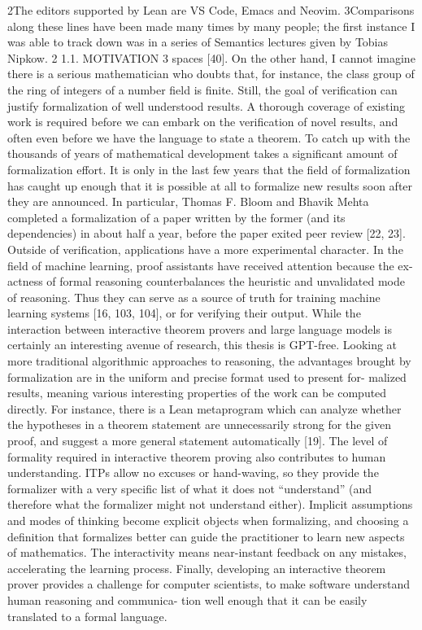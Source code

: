 \documentclass{book}
\theoremstyle{definition}
\begin{document}
2The editors supported by Lean are VS Code, Emacs and Neovim.
3Comparisons along these lines have been made many times by many people; the first instance I was
 able to track down was in a series of Semantics lectures given by Tobias Nipkow. 2
1.1. MOTIVATION   3
spaces [40]. On the other hand, I cannot imagine there is a serious mathematician who doubts that, for instance, the class group of the ring of integers of a number field is finite.
Still, the goal of verification can justify formalization of well understood results. A thorough coverage of existing work is required before we can embark on the verification of novel results, and often even before we have the language to state a theorem. To catch up with the thousands of years of mathematical development takes a significant amount of formalization effort. It is only in the last few years that the field of formalization has caught up enough that it is possible at all to formalize new results soon after they are announced. In particular, Thomas F. Bloom and Bhavik Mehta completed a formalization of a paper written by the former (and its dependencies) in about half a year, before the paper exited peer review [22, 23].
Outside of verification, applications have a more experimental character. In the field of machine learning, proof assistants have received attention because the ex- actness of formal reasoning counterbalances the heuristic and unvalidated mode of reasoning. Thus they can serve as a source of truth for training machine learning systems [16, 103, 104], or for verifying their output. While the interaction between interactive theorem provers and large language models is certainly an interesting avenue of research, this thesis is GPT-free.
Looking at more traditional algorithmic approaches to reasoning, the advantages brought by formalization are in the uniform and precise format used to present for- malized results, meaning various interesting properties of the work can be computed directly. For instance, there is a Lean metaprogram which can analyze whether the hypotheses in a theorem statement are unnecessarily strong for the given proof, and suggest a more general statement automatically [19].
The level of formality required in interactive theorem proving also contributes to human understanding. ITPs allow no excuses or hand-waving, so they provide the formalizer with a very specific list of what it does not “understand” (and therefore what the formalizer might not understand either). Implicit assumptions and modes of thinking become explicit objects when formalizing, and choosing a definition that formalizes better can guide the practitioner to learn new aspects of mathematics. The interactivity means near-instant feedback on any mistakes, accelerating the learning process. Finally, developing an interactive theorem prover provides a challenge for computer scientists, to make software understand human reasoning and communica- tion well enough that it can be easily translated to a formal language.
\end{document}
